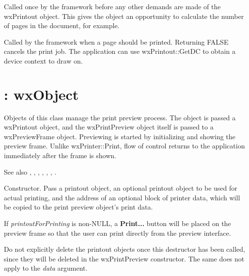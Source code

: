 Called once by the framework before any other demands are made of the
wxPrintout object. This gives the object an opportunity to calculate the
number of pages in the document, for example.



Called by the framework when a page should be printed. Returning FALSE cancels
the print job. The application can use wxPrintout::GetDC to obtain a device
context to draw on.

\section{: wxObject}\label{wxprintpreview}


Objects of this class manage the print preview process. The object is passed
a wxPrintout object, and the wxPrintPreview object itself is passed to
a wxPreviewFrame object. Previewing is started by initializing and showing
the preview frame. Unlike wxPrinter::Print, flow of control returns to the application
immediately after the frame is shown.

See also , ,\rtfsp
{}, ,\rtfsp
{}, ,\rtfsp
{}.



Constructor. Pass a printout object, an optional printout object to be
used for actual printing, and the address of an optional
block of printer data, which will be copied to the print preview object's
print data.

If {\it printoutForPrinting} is non-NULL, a {\bf Print...} button will be placed on the
preview frame so that the user can print directly from the preview interface.

Do not explicitly delete the printout objects once this destructor has been
called, since they will be deleted in the wxPrintPreview constructor.
The same does not apply to the {\it data} argument.

